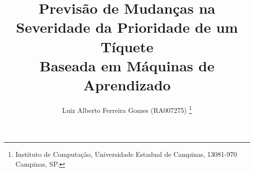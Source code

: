 \documentclass[11pt,twoside]{article}
\begin{document}
\TRNumber{}
\TRMakeCover

\pagestyle{myheadings}

\title{Previsão de Mudanças na Severidade da Prioridade de um Tíquete\\ Baseada 
em Máquinas de Aprendizado}

\author{Luiz Alberto Ferreira Gomes (RA007275) \thanks{Instituto  de Computação, Universidade
Estadual  de Campinas, 13081-970  Campinas,  SP.}}

\date{}

\maketitle

\end{document}
